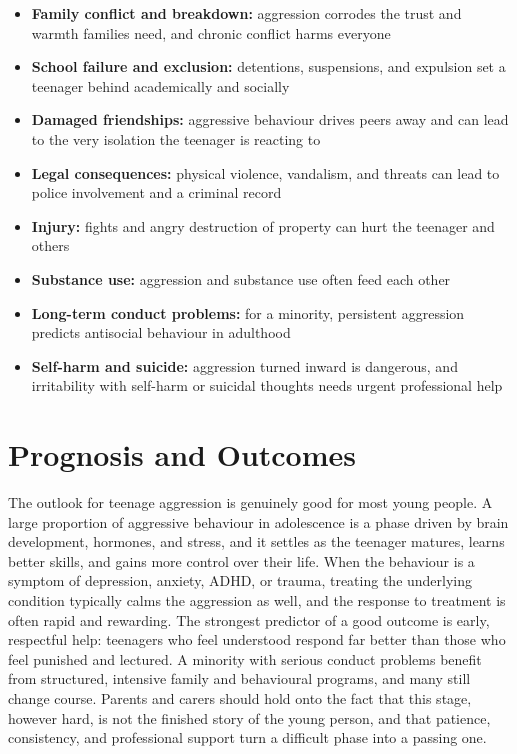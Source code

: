 \begin{itemize}
    \item \textbf{Family conflict and breakdown:} aggression corrodes the trust and warmth families need, and chronic conflict harms everyone
    \item \textbf{School failure and exclusion:} detentions, suspensions, and expulsion set a teenager behind academically and socially
    \item \textbf{Damaged friendships:} aggressive behaviour drives peers away and can lead to the very isolation the teenager is reacting to
    \item \textbf{Legal consequences:} physical violence, vandalism, and threats can lead to police involvement and a criminal record
    \item \textbf{Injury:} fights and angry destruction of property can hurt the teenager and others
    \item \textbf{Substance use:} aggression and substance use often feed each other
    \item \textbf{Long-term conduct problems:} for a minority, persistent aggression predicts antisocial behaviour in adulthood
    \item \textbf{Self-harm and suicide:} aggression turned inward is dangerous, and irritability with self-harm or suicidal thoughts needs urgent professional help
\end{itemize}

\section*{Prognosis and Outcomes}
The outlook for teenage aggression is genuinely good for most young people. A large proportion of aggressive behaviour in adolescence is a phase driven by brain development, hormones, and stress, and it settles as the teenager matures, learns better skills, and gains more control over their life. When the behaviour is a symptom of depression, anxiety, ADHD, or trauma, treating the underlying condition typically calms the aggression as well, and the response to treatment is often rapid and rewarding. The strongest predictor of a good outcome is early, respectful help: teenagers who feel understood respond far better than those who feel punished and lectured. A minority with serious conduct problems benefit from structured, intensive family and behavioural programs, and many still change course. Parents and carers should hold onto the fact that this stage, however hard, is not the finished story of the young person, and that patience, consistency, and professional support turn a difficult phase into a passing one.

